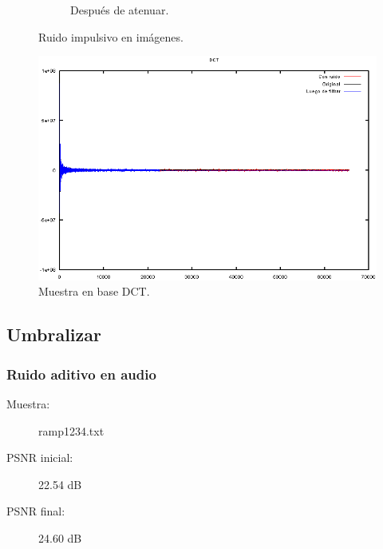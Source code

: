 \documentclass[a4paper,10pt,twoside]{article}
\begin{document}
\begin{figure}[H]
\begin{subfigure}[b]{0.45\textwidth}
    \caption{Después de atenuar.}
  \end{subfigure}
  \caption{Ruido impulsivo en imágenes.}
\end{figure}

\begin{figure}[H]
  \centering
  \includegraphics[width=15cm]{graficos/lena_impulsivo_atenuar_dct.png} 
  \caption{Muestra en base DCT.}
\end{figure}




\subsection{Umbralizar}

\subsubsection{Ruido aditivo en audio}

\begin{description}
  \item[Muestra:] ramp1234.txt
  \item[PSNR inicial:] 22.54 dB
  \item[PSNR final:] 24.60 dB
\end{description}
\end{document}
